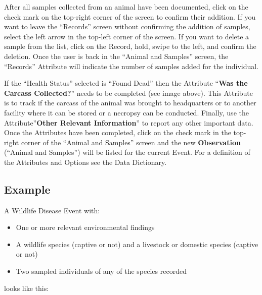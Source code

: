 \documentclass[
  letterpaper,
  DIV=11,
  numbers=noendperiod]{scrreprt}
\begin{document}
After all samples collected from an animal have been documented, click
on the check mark on the top-right corner of the screen to confirm their
addition. If you want to leave the ``Records'' screen without confirming
the addition of samples, select the left arrow in the top-left corner of
the screen. If you want to delete a sample from the list, click on the
Record, hold, swipe to the left, and confirm the deletion. Once the user
is back in the ``Animal and Samples'' screen, the ``Records'' Attribute
will indicate the number of samples added for the individual.

If the ``Health Status'' selected is ``Found Dead'' then the Attribute
``\textbf{Was the Carcass Collected?}'' needs to be completed (see image
above). This Attribute is to track if the carcass of the animal was
brought to headquarters or to another facility where it can be stored or
a necropsy can be conducted. Finally, use the Attribute''\textbf{Other
Relevant Information}'' to report any other important data. Once the
Attributes have been completed, click on the check mark in the top-right
corner of the ``Animal and Samples'' screen and the new
\textbf{Observation} (``Animal and Samples'') will be listed for the
current Event. For a definition of the Attributes and Options see the
Data Dictionary.

\hypertarget{example}{%
\subsection*{Example}\label{example}}

A Wildlife Disease Event with:

\begin{itemize}
\item
  One or more relevant environmental findings
\item
  A wildlife species (captive or not) and a livestock or domestic
  species (captive or not)
\item
  Two sampled individuals of any of the species recorded
\end{itemize}

looks like this:
\end{document}
